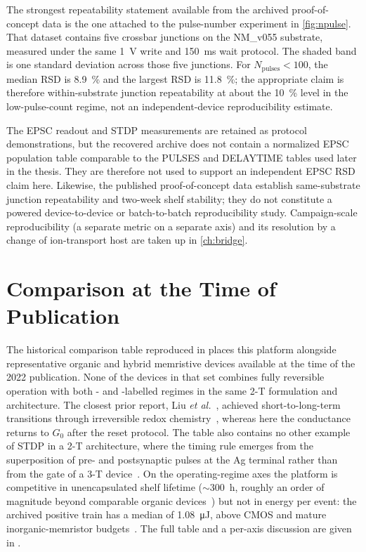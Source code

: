 \documentclass[12pt, twoside]{report}
\begin{document}
The strongest repeatability statement available from the archived proof-of-concept data is the one attached to the pulse-number experiment in \cref{fig:npulse}. That dataset contains five crossbar junctions on the NM\_v055 substrate, measured under the same \SI{1}{\volt} write and \SI{150}{\milli\second} wait protocol. The shaded band is one standard deviation across those five junctions. For $N_{\mathrm{pulses}} < 100$, the median RSD is \SI{8.9}{\percent} and the largest RSD is \SI{11.8}{\percent}; the appropriate claim is therefore within-substrate junction repeatability at about the \SI{10}{\percent} level in the low-pulse-count regime, not an independent-device reproducibility estimate.

The EPSC readout and STDP measurements are retained as protocol demonstrations, but the recovered archive does not contain a normalized EPSC population table comparable to the PULSES and DELAYTIME tables used later in the thesis. They are therefore not used to support an independent EPSC RSD claim here. Likewise, the published proof-of-concept data establish same-substrate junction repeatability and two-week shelf stability; they do not constitute a powered device-to-device or batch-to-batch reproducibility study. Campaign-scale reproducibility (a separate metric on a separate axis) and its resolution by a change of ion-transport host are taken up in \cref{ch:bridge}.


\section{Comparison at the Time of Publication}\label{sec:comparison}

The historical comparison table reproduced in  places this platform alongside representative organic and hybrid memristive devices available at the time of the 2022 publication. None of the devices in that set combines fully reversible operation with both \STM{}- and \LTM{}-labelled regimes in the same 2-T formulation and architecture. The closest prior report, Liu \textit{et al.}~\cite{Liu2016}, achieved short-to-long-term transitions through irreversible redox chemistry~\cite{Heremans2011}, whereas here the conductance returns to \(G_0\) after the reset protocol. The table also contains no other example of STDP in a 2-T architecture, where the timing rule emerges from the superposition of pre- and postsynaptic pulses at the Ag terminal rather than from the gate of a 3-T device~\cite{Gkoupidenis2015,Kim2018,Seo2019}. On the operating-regime axes the platform is competitive in unencapsulated shelf lifetime (\(\sim\)\SI{300}{\hour}, roughly an order of magnitude beyond comparable organic devices~\cite{Shih2016}) but not in energy per event: the archived positive train has a median of \SI{1.08}{\micro\joule}, above CMOS and mature inorganic-memristor budgets~\cite{IndiveriLiu2015,YangStrukovStewart2013}. The full table and a per-axis discussion are given in .
\end{document}
